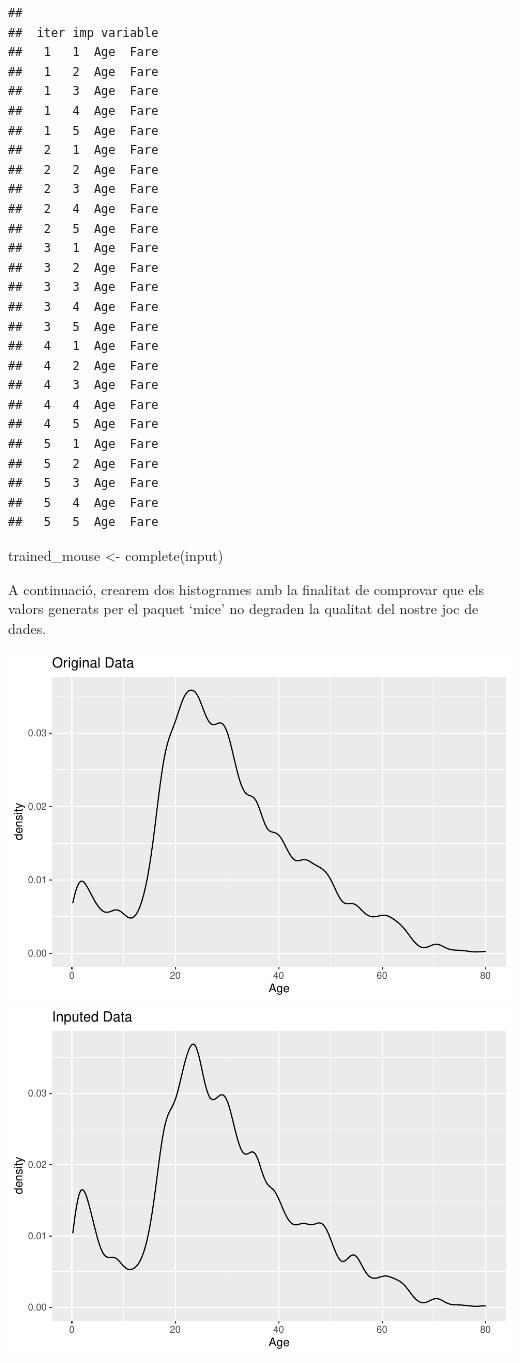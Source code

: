 \documentclass[
]{article}
\newenvironment{Shaded}{\begin{snugshade}}{\end{snugshade}}
\newcommand{\FunctionTok}[1]{\textcolor[rgb]{0.94,0.94,0.56}{#1}}
\newcommand{\NormalTok}[1]{\textcolor[rgb]{0.80,0.80,0.80}{#1}}
\newcommand{\OtherTok}[1]{\textcolor[rgb]{0.94,0.94,0.56}{#1}}
\begin{document}
\begin{verbatim}
## 
##  iter imp variable
##   1   1  Age  Fare
##   1   2  Age  Fare
##   1   3  Age  Fare
##   1   4  Age  Fare
##   1   5  Age  Fare
##   2   1  Age  Fare
##   2   2  Age  Fare
##   2   3  Age  Fare
##   2   4  Age  Fare
##   2   5  Age  Fare
##   3   1  Age  Fare
##   3   2  Age  Fare
##   3   3  Age  Fare
##   3   4  Age  Fare
##   3   5  Age  Fare
##   4   1  Age  Fare
##   4   2  Age  Fare
##   4   3  Age  Fare
##   4   4  Age  Fare
##   4   5  Age  Fare
##   5   1  Age  Fare
##   5   2  Age  Fare
##   5   3  Age  Fare
##   5   4  Age  Fare
##   5   5  Age  Fare
\end{verbatim}

\begin{Shaded}
\begin{Highlighting}[]
\NormalTok{trained\_mouse }\OtherTok{\textless{}{-}} \FunctionTok{complete}\NormalTok{(input)}
\end{Highlighting}
\end{Shaded}

A continuació, crearem dos histogrames amb la finalitat de comprovar que
els valors generats per el paquet `mice' no degraden la qualitat del
nostre joc de dades.

\includegraphics{titanic-analysis_files/figure-latex/pplot-1.pdf}
\includegraphics{titanic-analysis_files/figure-latex/pplot-2.pdf}
\end{document}
